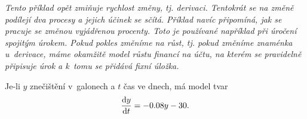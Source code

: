 \textit{Tento příklad opět zmiňuje rychlost změny, tj. derivaci. Tentokrát se na změně podílejí dva procesy a jejich účinek se sčítá. Příklad navíc připomíná, jak se pracuje se změnou vyjádřenou procenty. Toto je používané například při úročení spojitým úrokem. Pokud pokles změníme na růst, tj. pokud změníme
  znaménka u derivace, máme okamžitě model růstu financí na účtu, na kterém se pravidelně připisuje úrok a k tomu se přidává fixní úložka.}

\reseni Je-li $y$ znečištění v galonech a $t$ čas ve dnech, má model tvar
$$\frac{\mathrm dy}{\mathrm dt}=-0.08y-30.$$

\konec









